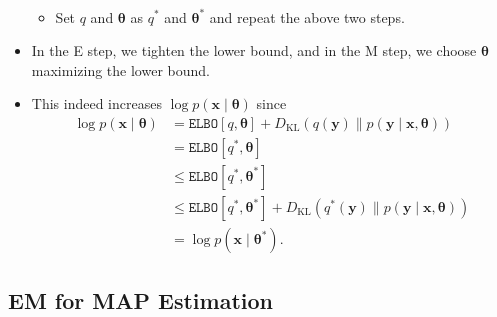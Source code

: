 \documentclass[10pt]{article}
\newcommand{\elbo}{\texttt{ELBO}}
\newcommand{\KL}{D_{\text{KL}}}
\begin{document}
\begin{itemize}
\begin{itemize}
\begin{align*}
\end{align*}
\item Set $q$ and $\bm{\theta}$ as $q^*$ and $\bm{\theta}^*$ and repeat the above two steps.
\end{itemize}
\item In the E step, we tighten the lower bound, and in the M step, we choose $\bm{\theta}$ maximizing the lower bound.
\item This indeed increases $\log p(\bm{x} \mid \bm{\theta})$ since
\begin{align*}
\log p(\bm{x} \mid \bm{\theta}) &= \elbo[q,\bm{\theta}] + \KL(q(\bm{y}) \| p(\bm{y} \mid \bm{x}, \bm{\theta})) \\
&= \elbo[q^*,\bm{\theta}] \\
&\leq \elbo[q^*,\bm{\theta}^*] \\
&\leq \elbo[q^*,\bm{\theta}^*] + \KL(q^*(\bm{y}) \| p(\bm{y} \mid \bm{x}, \bm{\theta})) \\
&= \log p(\bm{x} \mid \bm{\theta}^*).
\end{align*}
\end{itemize}

\subsection{EM for MAP Estimation}
\end{document}
